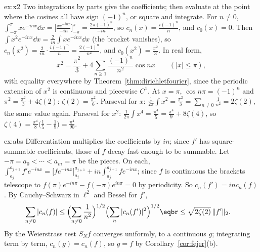 \begin{solution}{ex:x2}
\idea Two integrations by parts give the coefficients; then evaluate at the point where the cosines all have sign
$(-1)^n$, or square and integrate.
\writeup For $n\ne0$, $\int_{-\pi}^\pi xe^{-inx}\dd x=\bigl[\frac{xe^{-inx}}{-in}\bigr]_{-\pi}^\pi=\frac{2\pi(-1)^n}{-in}$, so $c_n(x)=\frac{i(-1)^n}n$, and $c_0(x)=0$. Then
$\int x^2e^{-inx}\dd x=\frac2{in}\int xe^{-inx}\dd x$ (the bracket vanishes), so $c_n(x^2)=\frac2{in}\cdot\frac{i(-1)^n}n=\frac{2(-1)^n}{n^2}$, and $c_0(x^2)=\frac{\pi^2}3$. In real form,
\[
x^2=\frac{\pi^2}3+4\sum_{n\ge1}\frac{(-1)^n}{n^2}\cos nx\qquad(|x|\le\pi),
\]
with equality everywhere by Theorem~\ref{thm:dirichletfourier}, since the periodic extension of $x^2$ is continuous and piecewise $C^1$. At $x=\pi$,
$\cos n\pi=(-1)^n$ and $\pi^2=\frac{\pi^2}3+4\zeta(2)$: $\zeta(2)=\frac{\pi^2}6$. Parseval for $x$: $\frac1{2\pi}\int x^2=\frac{\pi^2}3=\sum_{n\ne0}\frac1{n^2}=2\zeta(2)$, the
same value again. Parseval for $x^2$: $\frac1{2\pi}\int x^4=\frac{\pi^4}5=\frac{\pi^4}9+8\zeta(4)$, so $\zeta(4)=\frac{\pi^4}8\bigl(\frac15-\frac19\bigr)=\frac{\pi^4}{90}$.
\end{solution}

\begin{solution}{ex:abs}
\idea Differentiation multiplies the coefficients by $in$; since $f'$ has square-summable coefficients, those of $f$ decay fast
enough to be summable.
\writeup Let $-\pi=a_0<\cdots<a_m=\pi$ be the pieces. On each, $\int_{a_j}^{a_{j+1}}f'e^{-inx}=\bigl[fe^{-inx}\bigr]_{a_j}^{a_{j+1}}+in\int_{a_j}^{a_{j+1}}fe^{-inx}$; since $f$
is continuous the brackets telescope to $f(\pi)e^{-in\pi}-f(-\pi)e^{in\pi}=0$ by periodicity. So $c_n(f')=inc_n(f)$. By Cauchy--Schwarz in $\ell^2$
and Bessel for $f'$,
\[
\begin{aligned}\sum_{n\ne0}|c_n(f)|&\le\Bigl(\sum_{n\ne0}\frac1{n^2}\Bigr)^{1/2}\Bigl(\sum_n|c_n(f')|^2\Bigr)^{1/2}\eqbr\le\sqrt{2\zeta(2)}\,\|f'\|_2.\end{aligned}
\]
By the Weierstrass test $S_Nf$ converges uniformly, to a continuous $g$; integrating term by term, $c_n(g)=c_n(f)$, so $g=f$ by
Corollary~\ref{cor:fejer}(b).
\end{solution}

